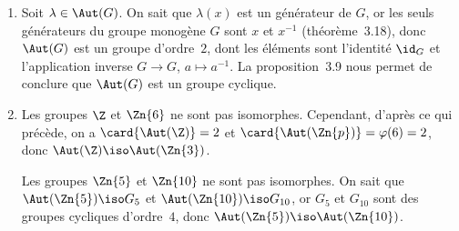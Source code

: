 \begin{enumerate}
  \item %
    Soit $\lambda\in\Aut(G)$.
    On sait que $\lambda(x)$ est un générateur de $G$, or les seuls générateurs du groupe monogène $G$ sont $x$ et $x^{-1}$ (théorème~3.18), donc $\Aut(G)$ est un groupe d'ordre~$2$, dont les éléments sont l'identité $\id_G$ et l'application inverse $G\to G$, $a\mapsto a^{-1}$.
    La proposition~3.9 nous permet de conclure que $\Aut(G)$ est un groupe cyclique.

  \item %
    Les groupes $\Z$ et $\Zn{6}$ ne sont pas isomorphes.
    Cependant, d'après ce qui précède, on a $\card{\Aut(\Z)} = 2$ et $\card{\Aut(\Zn{p})} = \varphi(6) = 2$, donc $\Aut(\Z)\iso\Aut(\Zn{3})$.

    Les groupes $\Zn{5}$ et $\Zn{10}$ ne sont pas isomorphes.
  On sait que $\Aut(\Zn{5}) \iso G_5$ et $\Aut(\Zn{10}) \iso G_{10}$, or $G_5$ et $G_{10}$ sont des groupes cycliques d'ordre~$4$, donc $\Aut(\Zn{5}) \iso \Aut(\Zn{10})$.
\end{enumerate}
